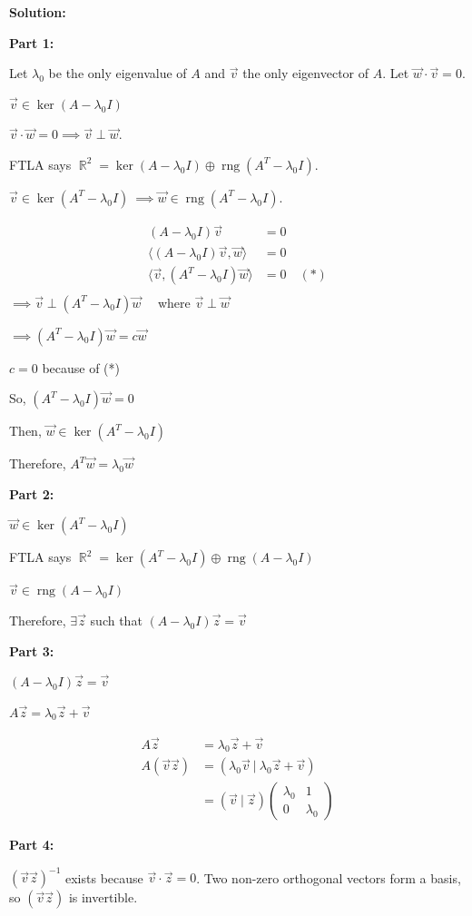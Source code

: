 \documentclass[12pt]{article}
\DeclareMathOperator{\RR}{\mathbb{R}}
\DeclareMathOperator{\rng}{rng}
\newenvironment{solution}{
    \textbf{Solution:}
    
}{
    
    \vspace{2em}
}
\begin{document}
\begin{solution}
    \textbf{Part 1:}

    Let \(\lambda_0\) be the only eigenvalue of \(A\) and \(\vec{v}\) the only eigenvector of \(A\). Let \(\vec{w} \cdot \vec{v} = 0\).

    \(\vec{v} \in \ker(A - \lambda_0I)\)

    \(\vec{v} \cdot \vec{w} = 0 \implies \vec{v} \perp \vec{w}\).

    FTLA says \(\RR^2 = \ker(A - \lambda_0I) \oplus \rng(A^T - \lambda_0I)\).

    \(\vec{v} \in \ker(A^T - \lambda_0I)\ \implies \vec{w} \in \rng(A^T - \lambda_0I)\).

    \[
        \begin{aligned}
            (A - \lambda_0I)\vec{v} &= 0\\
            \langle (A - \lambda_0I)\vec{v}, \vec{w} \rangle &= 0\\
            \langle \vec{v}, (A^T - \lambda_0I)\vec{w} \rangle &= 0 \quad (*)\\
        \end{aligned}
    \]
    \(\implies \vec{v} \perp (A^T - \lambda_0I)\vec{w} \quad\) where \(\vec{v} \perp \vec{w}\)

    \(\implies (A^T - \lambda_0I)\vec{w} = c\vec{w}\)

    \(c = 0\) because of (*)

    So, \((A^T - \lambda_0I)\vec{w} = 0\)

    Then, \(\vec{w} \in \ker(A^T - \lambda_0I)\)

    Therefore, \(A^T\vec{w} = \lambda_0\vec{w}\)

    \textbf{Part 2:}

    \(\vec{w} \in \ker(A^T - \lambda_0I)\)

    FTLA says \(\RR^2 = \ker(A^T - \lambda_0I) \oplus \rng(A - \lambda_0I)\)

    \(\vec{v} \in \rng(A - \lambda_0I)\)

    Therefore, \(\exists \vec{z}\) such that \((A - \lambda_0I)\vec{z} = \vec{v}\)

    \textbf{Part 3:}

    \((A - \lambda_0I)\vec{z} = \vec{v}\)

    \(A\vec{z} = \lambda_0\vec{z} + \vec{v}\)

    \[
        \begin{aligned}
            A\vec{z} &= \lambda_0\vec{z} + \vec{v}\\
            A(\vec{v} \vec{z}) &= (\lambda_0\vec{v} \: | \: \lambda_0\vec{z} + \vec{v})\\
            &= (\vec{v} \: | \: \vec{z}) \begin{pmatrix}
                \lambda_0 & 1 \\
                0 & \lambda_0
            \end{pmatrix}
        \end{aligned}
    \]

    \textbf{Part 4:}

    \((\vec{v} \vec{z})^{-1}\) exists because \(\vec{v} \cdot \vec{z} = 0\). Two non-zero orthogonal vectors form a basis, so \((\vec{v} \vec{z})\) is invertible.
    
    

\end{solution}
    
\end{document}
